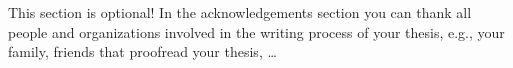 \begin{acknowledgements}
   This section is optional!
   In the acknowledgements section you can thank all people and organizations involved in the writing process of your thesis, e.g., your family, friends that proofread your thesis, \dots
\end{acknowledgements}
